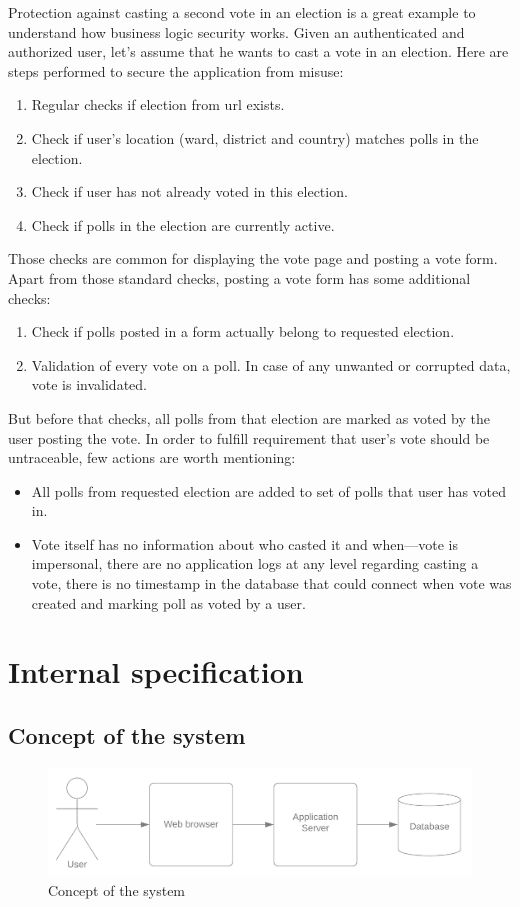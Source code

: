 \documentclass[a4paper,twoside,12pt]{book}
\begin{document}
      Protection against casting a second vote in an election is a great example to understand how business logic security works.
      Given an authenticated and authorized user, let's assume that he wants to cast a vote in an election. 
      Here are steps performed to secure the application from misuse:
      \begin{enumerate}
        \item Regular checks if election from url exists.
        \item Check if user's location (ward, district and country) matches polls in the election.
        \item Check if user has not already voted in this election.
        \item Check if polls in the election are currently active.
      \end{enumerate}
      Those checks are common for displaying the vote page and posting a vote form.
      Apart from those standard checks, posting a vote form has some additional checks:
      \begin{enumerate}
        \item Check if polls posted in a form actually belong to requested election.
        \item Validation of every vote on a poll. In case of any unwanted or corrupted data, vote is invalidated.
      \end{enumerate}
      But before that checks, all polls from that election are marked as voted by the user posting the vote.
      In order to fulfill requirement that user's vote should be untraceable, few actions are worth mentioning:
      \begin{itemize}
        \item All polls from requested election are added to set of polls that user has voted in.
        \item Vote itself has no information about who casted it and when---vote is impersonal, 
          there are no application logs at any level regarding casting a vote, 
          there is no timestamp in the database that could connect when vote was created and marking poll as voted by a user.
      \end{itemize}

\chapter{Internal specification}
  \section{Concept of the system}
    \begin{figure}[h]
      \includegraphics[width=\linewidth]{system_concept.png}
      \caption{Concept of the system}
      \label{fig:system_concept}
    \end{figure}
\end{document}
